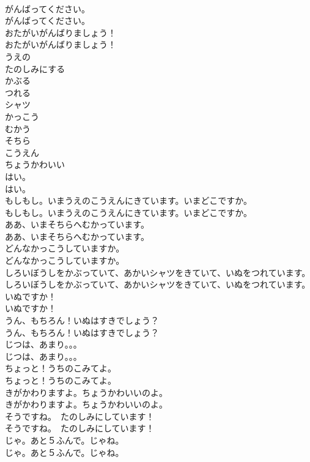 \documentclass[8pt]{extreport}
\begin{document}
\begin{CJK}{UTF8}{min}
\\	がんばってください。	
\\	がんばってください。 
\\	おたがいがんばりましょう！	
\\	おたがいがんばりましょう！ 
\\	うえの
\\	たのしみにする
\\	かぶる
\\	つれる
\\	シャツ
\\	かっこう
\\	むかう
\\	そちら
\\	こうえん
\\	ちょうかわいい
\\	はい。	
\\	はい。 
\\	もしもし。いまうえのこうえんにきています。いまどこですか。	
\\	もしもし。いまうえのこうえんにきています。いまどこですか。 
\\	ああ、いまそちらへむかっています。	
\\	ああ、いまそちらへむかっています。 
\\	どんなかっこうしていますか。	
\\	どんなかっこうしていますか。 
\\	しろいぼうしをかぶっていて、あかいシャツをきていて、いぬをつれています。	
\\	しろいぼうしをかぶっていて、あかいシャツをきていて、いぬをつれています。 
\\	いぬですか！	
\\	いぬですか！ 
\\	うん、もちろん！いぬはすきでしょう？	
\\	うん、もちろん！いぬはすきでしょう？ 
\\	じつは、あまり。。。	
\\	じつは、あまり。。。 
\\	ちょっと！うちのこみてよ。	
\\	ちょっと！うちのこみてよ。 
\\	きがかわりますよ。ちょうかわいいのよ。	
\\	きがかわりますよ。ちょうかわいいのよ。 
\\	そうですね。　たのしみにしています！	
\\	そうですね。　たのしみにしています！ 
\\	じゃ。あと５ふんで。じゃね。	
\\	じゃ。あと５ふんで。じゃね。 

\end{CJK}
\end{document}
